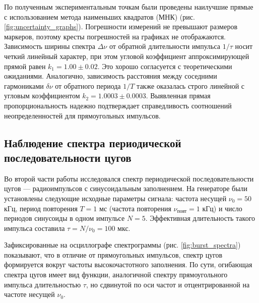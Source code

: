 \documentclass[reprint, amsmath, amssymb, aps, pra, nofootinbib]{revtex4-2}
\begin{document}
По полученным экспериментальным точкам были проведены наилучшие прямые с использованием метода наименьших квадратов (МНК) (рис. \ref{fig:uncertainty_graphs}). Погрешности измерений не превышают размеров маркеров, поэтому кресты погрешностей на графиках не отображаются. Зависимость ширины спектра $\Delta\nu$ от обратной длительности импульса $1/\tau$ носит четкий линейный характер, при этом угловой коэффициент аппроксимирующей прямой равен $k_1 = 1.00 \pm 0.02$. Это хорошо согласуется с теоретическими ожиданиями. Аналогично, зависимость расстояния между соседними гармониками $\delta\nu$ от обратного периода $1/T$ также оказалась строго линейной с угловым коэффициентом $k_2 = 1.0003 \pm 0.0003$. Выявленная прямая пропорциональность надежно подтверждает справедливость соотношений неопределенностей для прямоугольных импульсов.

\subsection{Наблюдение спектра периодической последовательности цугов}

Во второй части работы исследовался спектр периодической последовательности цугов — радиоимпульсов с синусоидальным заполнением. На генераторе были установлены следующие исходные параметры сигнала: частота несущей $\nu_0 = 50$ кГц, период повторения $T = 1$ мс (частота повторения $\nu_{\text{повт}} = 1$ кГц) и число периодов синусоиды в одном импульсе $N = 5$. Эффективная длительность такого импульса составила $\tau = N/\nu_0 = 100$ мкс.

Зафиксированные на осциллографе спектрограммы (рис. \ref{fig:burst_spectra}) показывают, что в отличие от прямоугольных импульсов, спектр цугов формируется вокруг частоты высокочастотного заполнения. По сути, огибающая спектра цугов имеет вид функции, аналогичной спектру прямоугольного импульса длительностью $\tau$, но сдвинутой по оси частот и отцентрированной на частоте несущей $\nu_0$.
\end{document}
